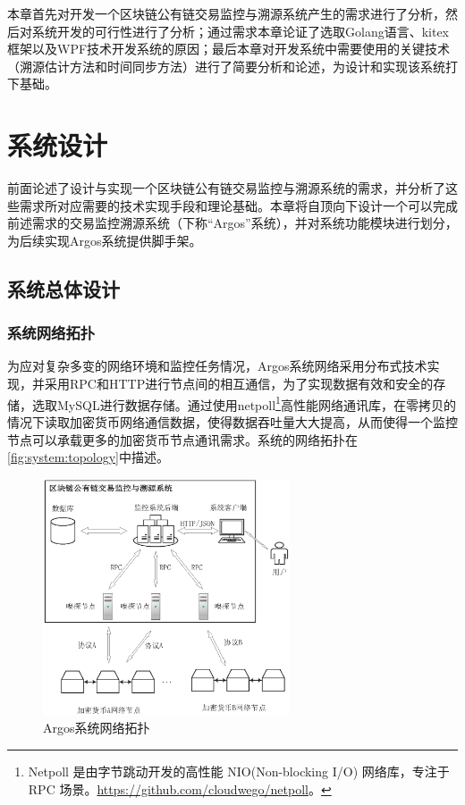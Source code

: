 \documentclass[supercite]{HustGraduPaper}
\newcommand{\xfig}[3]{
  \begin{figure}[htb]
    \centering
    #3
    \caption{#2}
    \label{fig:#1}
  \end{figure}
}
\newcommand{\rfig}[1]{\autoref{fig:#1}}
\theoremstyle{definition}
\begin{document}
本章首先对开发一个区块链公有链交易监控与溯源系统产生的需求进行了分析，然后对系统开发的可行性进行了分析；通过需求本章论证了选取Golang语言、kitex框架以及WPF技术开发系统的原因；最后本章对开发系统中需要使用的关键技术（溯源估计方法和时间同步方法）进行了简要分析和论述，为设计和实现该系统打下基础。

\newpage
\section{系统设计}

前面论述了设计与实现一个区块链公有链交易监控与溯源系统的需求，并分析了这些需求所对应需要的技术实现手段和理论基础。本章将自顶向下设计一个可以完成前述需求的交易监控溯源系统（下称“Argos”系统），并对系统功能模块进行划分，为后续实现Argos系统提供脚手架。
\subsection{系统总体设计}

\subsubsection{系统网络拓扑}
为应对复杂多变的网络环境和监控任务情况，Argos系统网络采用分布式技术实现，并采用RPC和HTTP进行节点间的相互通信，为了实现数据有效和安全的存储，选取MySQL进行数据存储。通过使用netpoll\footnote{Netpoll 是由字节跳动开发的高性能 NIO(Non-blocking I/O) 网络库，专注于 RPC 场景。\url{https://github.com/cloudwego/netpoll}。}高性能网络通讯库，在零拷贝\cite{stancevic2003zero}的情况下读取加密货币网络通信数据，使得数据吞吐量大大提高，从而使得一个监控节点可以承载更多的加密货币节点通讯需求。系统的网络拓扑在\rfig{system:topology}中描述。


\xfig{system:topology}{Argos系统网络拓扑}{
  \includegraphics[width=0.65\textwidth]{images/3.1-topology.ps}
}
\end{document}
